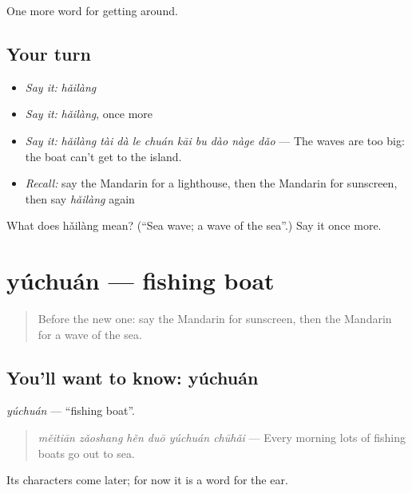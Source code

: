 \begin{grammarlens}[title={What you've built}]
One more word for getting around.
\end{grammarlens}

\subsection*{Your turn}
\begin{itemize}
\raggedright
  \item \emph{Say it:} \emph{hǎilàng}
  \item \emph{Say it:} \emph{hǎilàng}, once more
  \item \emph{Say it:} \emph{hǎilàng tài dà le chuán kāi bu dào nàge dǎo} — The waves are too big: the boat can't get to the island.
  \item \emph{Recall:} say the Mandarin for a lighthouse, then the Mandarin for sunscreen, then say \emph{hǎilàng} again
\end{itemize}

\begin{tcolorbox}[breakable,colback=teal!4,colframe=teal!35!black,title={Before you move on}]
What does hǎilàng mean? (\textquotedblleft{}Sea wave; a wave of the sea\textquotedblright{}.) Say it once more.
\end{tcolorbox}
\section[yúchuán]{yúchuán — fishing boat}

\label{lesson:ZH-C445-yuchuan}



\begin{quote}
Before the new one: say the Mandarin for sunscreen, then the Mandarin for a wave of the sea.
\end{quote}

\subsection*{You'll want to know: yúchuán}
\emph{yúchuán} — \textquotedblleft{}fishing boat\textquotedblright{}.

\begin{quote}
\emph{měitiān zǎoshang hěn duō yúchuán chūhǎi} — Every morning lots of fishing boats go out to sea.
\end{quote}

Its characters come later; for now it is a word for the ear.


